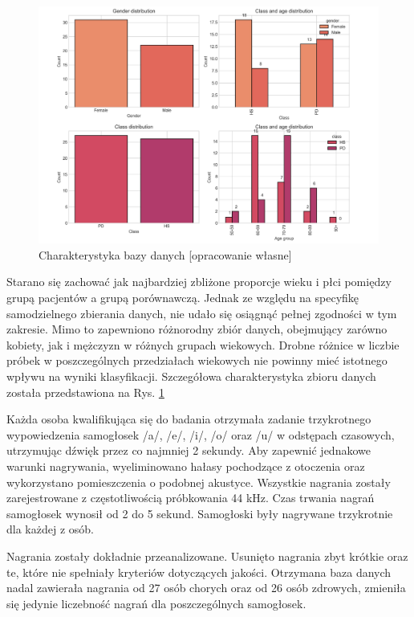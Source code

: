 \begin{figure}[htbp]
	\centering
	\includegraphics[width=1\textwidth]{./img/database}
	\caption{Charakterystyka bazy danych [opracowanie własne]}
    \label{fig:database}
\end{figure}

Starano się zachować jak najbardziej zbliżone proporcje wieku i płci pomiędzy grupą
pacjentów a grupą porównawczą.
Jednak ze względu na specyfikę samodzielnego zbierania danych, nie udało się osiągnąć pełnej zgodności w tym zakresie.
Mimo to zapewniono różnorodny zbiór danych, obejmujący zarówno kobiety, jak i mężczyzn w różnych grupach wiekowych.
Drobne różnice w liczbie próbek w poszczególnych przedziałach wiekowych nie powinny mieć istotnego wpływu na wyniki
klasyfikacji.
Szczegółowa charakterystyka zbioru danych została przedstawiona na Rys. \ref{fig:database}

Każda osoba kwalifikująca się do badania otrzymała zadanie trzykrotnego wypowiedzenia
samogłosek /a/, /e/, /i/, /o/ oraz /u/ w odstępach czasowych, utrzymując dźwięk przez co najmniej 2 sekundy.
Aby zapewnić jednakowe warunki nagrywania, wyeliminowano hałasy pochodzące z
otoczenia oraz wykorzystano pomieszczenia o podobnej akustyce.
Wszystkie nagrania zostały zarejestrowane z częstotliwością próbkowania 44 kHz.
Czas trwania nagrań samogłosek wynosił od 2 do 5 sekund.
Samogłoski były nagrywane trzykrotnie dla każdej z osób.

Nagrania zostały dokładnie przeanalizowane.
Usunięto nagrania zbyt krótkie oraz te, które nie spełniały kryteriów dotyczących jakości.
Otrzymana baza danych nadal zawierała nagrania od 27 osób chorych oraz od 26 osób zdrowych, zmieniła się jedynie liczebność nagrań dla poszczególnych
samogłosek.

